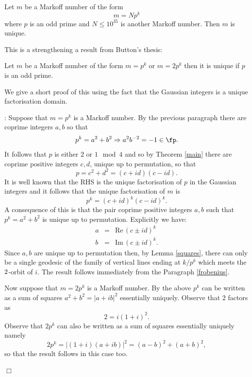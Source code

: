  \begin{thm}[Aigner]
 Let $m$ be a Markoff number of the form 
 $$m =Np^k$$
 where $p$ is an odd prime and $N \leq 10^{35}$ is another Markoff number. Then $m$ is unique.
 \end{thm}
 
 This is a strengthening a result from Button's thesis:
 
  \begin{thm} \label{button}
 Let $m$ be a Markoff number of the form 
 $m=p^k$ or $m=2p^k$ then it is unique
if $p$ is an odd prime.
 \end{thm}

We give a short proof of this using the fact that the Gaussian integers
 is a unique factorisation domain.

\proof: Suppose that $m=p^k$ is a Markoff number. By the previous paragraph there are coprime integers $a,b$ so that 
$$p^k = a^2 + b^2 \Rightarrow a^2b^{-2} = -1 \in \fp.$$
It follows that $p$ is either $2$ or $1 \mod 4$ and 
so by Theorem \ref{main} there are coprime positive integers $c,d$,
 unique up to permutation,
so that  $$p = c^2 + d^2 = (c + id)(c - id).$$
It is well known that the RHS is the unique factorisation of $p$ in the Gaussian integers
and it follows that the unique factorisation of $m$ is
$$p^k = (c + id)^k(c - id)^k.$$
A consequence of this is that the pair coprime positive integers $a,b$ such that $p^k = a^2 + b^2$
is unique up to permutation. Explicitly we have:
\begin{eqnarray}
a &=& \mathrm{Re}\, (c\pm id)^k \\
b &=& \mathrm{Im}\, (c\pm id)^k.
\end{eqnarray}
Since $a,b$ are unique up to permutation 
then, by Lemma \ref{squares},
 there can only be a single  geodesic of the family
of vertical lines ending at  
$k/p^k$ which meets the $\sl2$-orbit of $i$.
The result follows immediately from the  Paragraph \ref{frobenius}.

Now suppose that  $m=2p^k$ is a Markoff number.
By the above  $p^k$ can be written as a sum of squares $a^2 + b^2 = |a + ib|^2$ 
essentially uniquely.
Observe that   $2$ factors as 
$$ 2 = i(1+i)^2.$$
Observe that $2 p^k$ can also  be written as a sum of squares
essentially uniquely namely
$$2p^k = |(1+i) (a + ib) |^2 =  (a-b)^2 + (a+b)^2,$$ 
so that the result follows in this case too.



\hfill $\Box$


%
% 

